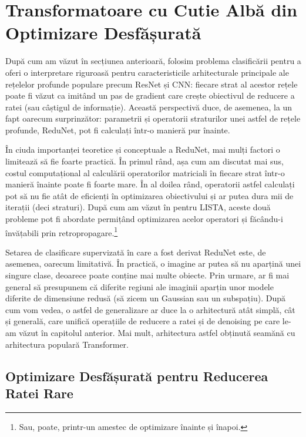 \documentclass[../../book-main_ro.tex]{subfiles}
\begin{document}
\section{Transformatoare cu Cutie Albă din Optimizare Desfășurată}\label{sec:chap4-white-box-transformer}
După cum am văzut în secțiunea anterioară, folosim problema clasificării pentru a oferi o interpretare riguroasă pentru caracteristicile arhitecturale principale ale rețelelor profunde populare precum ResNet și CNN: fiecare strat al acestor rețele poate fi văzut ca imitând un pas de gradient care crește obiectivul de reducere a ratei (sau câștigul de informație). Această perspectivă duce, de asemenea, la un fapt oarecum surprinzător: parametrii și operatorii straturilor unei astfel de rețele profunde, ReduNet, pot fi calculați într-o manieră pur înainte.

În ciuda importanței teoretice și conceptuale a ReduNet, mai mulți factori o limitează să fie foarte practică. În primul rând, așa cum am discutat mai sus, costul computațional al calculării operatorilor matriciali în fiecare strat într-o manieră înainte poate fi foarte mare. În al doilea rând, operatorii astfel calculați pot să nu fie atât de eficienți în optimizarea obiectivului și ar putea dura mii de iterații (deci straturi). După cum am văzut în  pentru LISTA, aceste două probleme pot fi abordate permițând optimizarea acelor operatori și făcându-i învățabili prin retropropagare.\footnote{Sau, poate, printr-un amestec de optimizare înainte și înapoi.}

Setarea de clasificare supervizată în care a fost derivat ReduNet este, de asemenea, oarecum limitativă. În practică, o imagine ar putea să nu aparțină unei singure clase, deoarece poate conține mai multe obiecte. Prin urmare, ar fi mai general să presupunem că diferite regiuni ale imaginii aparțin unor modele diferite de dimensiune redusă (să zicem un Gaussian sau un subspațiu). După cum vom vedea, o astfel de generalizare ar duce la o arhitectură atât simplă, cât și generală, care unifică operațiile de reducere a ratei și de denoising pe care le-am văzut în capitolul anterior. Mai mult, arhitectura astfel obținută seamănă cu arhitectura populară Transformer.



\subsection{Optimizare Desfășurată pentru Reducerea Ratei Rare}
\end{document}
